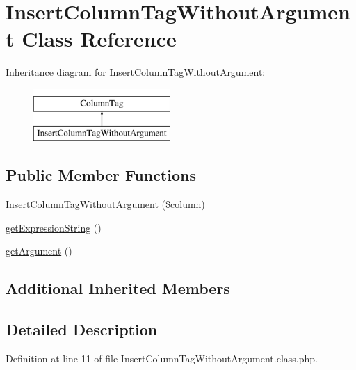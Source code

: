 \hypertarget{classInsertColumnTagWithoutArgument}{\section{Insert\-Column\-Tag\-Without\-Argument Class Reference}
\label{classInsertColumnTagWithoutArgument}
}
Inheritance diagram for Insert\-Column\-Tag\-Without\-Argument\-:\begin{figure}[H]
\begin{center}
\leavevmode
\includegraphics[height=2.000000cm]{classInsertColumnTagWithoutArgument}
\end{center}
\end{figure}
\subsection*{Public Member Functions}
\begin{DoxyCompactItemize}
\item 
\hyperlink{classInsertColumnTagWithoutArgument_ae1e10363dd8d24dff6cd05ca7711e455}{Insert\-Column\-Tag\-Without\-Argument} (\$column)
\item 
\hyperlink{classInsertColumnTagWithoutArgument_a0ea3febe1aed5e5f0fd8ac97fb0a8ac6}{get\-Expression\-String} ()
\item 
\hyperlink{classInsertColumnTagWithoutArgument_a728f587b2a45ff2b56c1f883197a3c4c}{get\-Argument} ()
\end{DoxyCompactItemize}
\subsection*{Additional Inherited Members}


\subsection{Detailed Description}


Definition at line 11 of file Insert\-Column\-Tag\-Without\-Argument.\-class.\-php.



